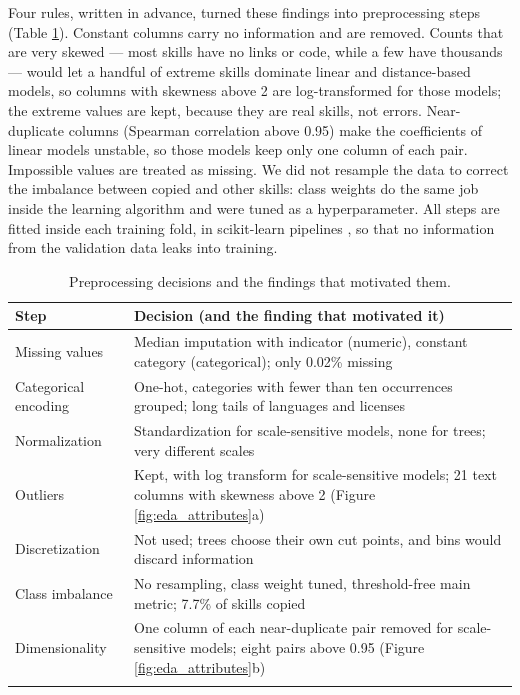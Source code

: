 Four rules, written in advance, turned these findings into preprocessing
steps (Table \ref{tab:preprocessing_steps}). Constant columns carry no
information and are removed. Counts that are very skewed --- most skills
have no links or code, while a few have thousands --- would let a
handful of extreme skills dominate linear and distance-based models, so
columns with skewness above 2 are log-transformed for those models; the
extreme values are kept, because they are real skills, not errors.
Near-duplicate columns (Spearman correlation above 0.95) make the
coefficients of linear models unstable, so those models keep only one
column of each pair. Impossible values are treated as missing. We did
not resample the data to correct the imbalance between copied and other
skills: class weights do the same job inside the learning algorithm and
were tuned as a hyperparameter. All steps are fitted inside each
training fold, in scikit-learn pipelines \cite{pedregosa2011scikit}, so
that no information from the validation data leaks into training.

\begin{table}[!tbp]
\centering
\caption{Preprocessing decisions and the findings that motivated them.
\label{tab:preprocessing_steps}}
\begin{tabular}{@{}
  >{\raggedright\arraybackslash}p{}
  >{\raggedright\arraybackslash}p{}@{}}
\toprule\noalign{}
\begin{minipage}[b]{\linewidth}\raggedright
Step
\end{minipage} & \begin{minipage}[b]{\linewidth}\raggedright
Decision (and the finding that motivated it)
\end{minipage} \\
\midrule\noalign{}
Missing values & Median imputation with indicator (numeric), constant
category (categorical); only 0.02\% missing \\
Categorical encoding & One-hot, categories with fewer than ten
occurrences grouped; long tails of languages and licenses \\
Normalization & Standardization for scale-sensitive models, none for
trees; very different scales \\
Outliers & Kept, with log transform for scale-sensitive models; 21 text
columns with skewness above 2 (Figure \ref{fig:eda_attributes}a) \\
Discretization & Not used; trees choose their own cut points, and bins
would discard information \\
Class imbalance & No resampling, class weight tuned, threshold-free main
metric; 7.7\% of skills copied \\
Dimensionality & One column of each near-duplicate pair removed for
scale-sensitive models; eight pairs above 0.95 (Figure
\ref{fig:eda_attributes}b) \\
\bottomrule\noalign{}
\end{tabular}
\end{table}

